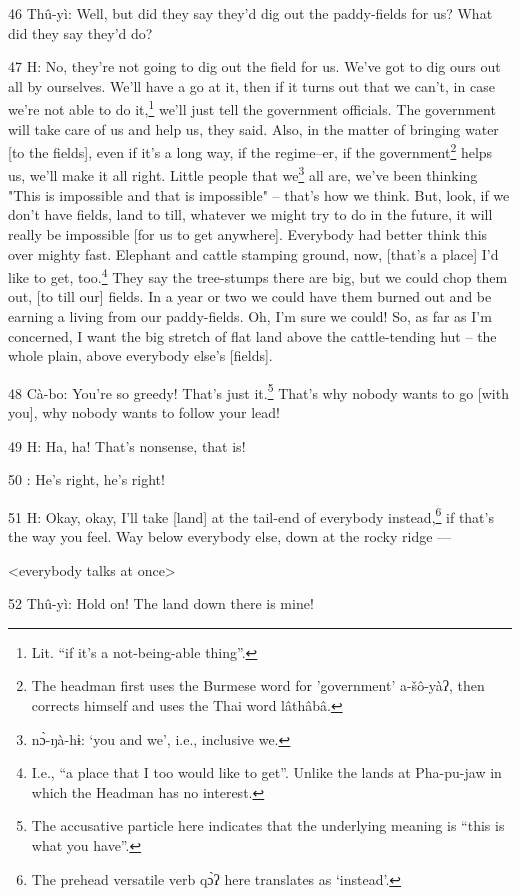 46 Thû-yì: Well, but did they say they'd dig out the paddy-fields for us? What
did they say they'd do?

47 H: No, they're not going to dig out the field for us. We've got to dig ours
out all by ourselves. We'll have a go at it, then if it turns out that we can't,
in case we're not able to do it,\footnote{Lit. ``if it's a not-being-able thing''.} we'll just tell the government officials.
The government will take care of us and help us, they said. Also, in the matter
of bringing water [to the fields], even if it's a long way, if the regime--er,
if the government\footnote{The headman first uses the Burmese word for 'government' a-šô-yàʔ, then corrects himself and uses the Thai word lâthâbâ.} helps us, we'll make it all right. Little people that we\footnote{nɔ̀-ŋà-hɨ: `you and we', i.e., inclusive we.}
all are, we've been thinking "This is impossible and that is impossible"
-- that's how we think. But, look, if we don't have fields, land to till, whatever
we might try to do in the future, it will really be impossible [for us to get anywhere].
Everybody had better think this over mighty fast. Elephant and cattle stamping
ground, now, [that's a place] I'd like to get, too.\footnote{I.e., ``a place that I too would like to get''. Unlike the lands at Pha-pu-jaw in which the Headman has no interest.} They say the tree-stumps
there are big, but we could chop them out, [to till our] fields. In a year or two
we could have them burned out and be earning a living from our paddy-fields. Oh,
I'm sure we could! So, as far as I'm concerned, I want the big stretch of flat
land above the cattle-tending hut -- the whole plain, above everybody else's [fields].

48 Cà-bo: You're so greedy! That's just it.\footnote{The accusative particle here indicates that the underlying meaning is ``this is what you have''.} That's why nobody wants to go
[with you], why nobody wants to follow your lead!

49 H: Ha, ha! That's nonsense, that is!

50      : He's right, he's right!

51 H: Okay, okay, I'll take [land] at the tail-end of everybody instead,\footnote{The prehead versatile verb qɔ̀ʔ here translates as `instead'.} if
that's the way you feel. Way below everybody else, down at the rocky ridge ---

<everybody talks at once>

52 Thû-yì: Hold on! The land down there is mine!

